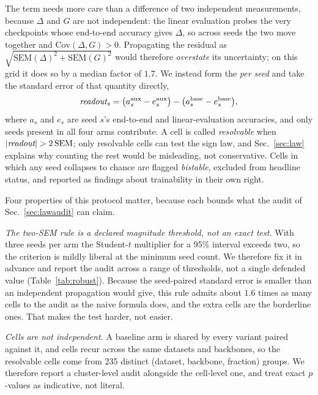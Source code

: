  The \readout{} term needs more care than a difference of two independent
measurements, because $\Delta$ and $G$ are not independent: the linear
evaluation probes the very checkpoints whose end-to-end accuracy gives
$\Delta$, so across seeds the two move together and $\mathrm{Cov}(\Delta, G) >
0$. Propagating the residual as $\sqrt{\mathrm{SEM}(\Delta)^2 +
\mathrm{SEM}(G)^2}$ would therefore \emph{overstate} its uncertainty; on this
grid it does so by a median factor of $1.7$. We instead form the \readout{}
\emph{per seed} and take the standard error of that quantity directly,
\begin{equation}
  \textit{readout}_s =
  \bigl(a^{\mathrm{aux}}_s - e^{\mathrm{aux}}_s\bigr) -
  \bigl(a^{\mathrm{base}}_s - e^{\mathrm{base}}_s\bigr),
  \label{eq:sem}
\end{equation}
where $a_s$ and $e_s$ are seed $s$'s end-to-end and linear-evaluation
accuracies, and only seeds present in all four arms contribute. A cell is
called \emph{resolvable} when $|\textit{readout}| > 2\,\mathrm{SEM}$; only
resolvable cells can test the sign law, and Sec.~\ref{sec:law} explains why
counting the rest would be misleading, not conservative. Cells in which any
seed collapses to chance are flagged \emph{bistable}, excluded from headline
status, and reported as findings about trainability in their own right.

Four properties of this protocol matter, because each bounds what the audit of
Sec.~\ref{sec:lawaudit} can claim.

\emph{The two-SEM rule is a declared magnitude threshold, not an exact test.}
With three seeds per arm the Student-$t$ multiplier for a 95\% interval exceeds
two, so the criterion is mildly liberal at the minimum seed count. We therefore
fix it in advance and report the audit across a range of thresholds, not a
single defended value (Table~\ref{tab:robust}). Because the seed-paired standard
error is smaller than an independent propagation would give, this rule admits
about $1.6$ times as many cells to the audit as the naive formula does, and the
extra cells are the borderline ones. That makes the test harder, not easier.

\emph{Cells are not independent.} A baseline arm is shared by every variant
paired against it, and cells recur across the same datasets and backbones, so
the \auditResolvable{} resolvable cells come from 235 distinct (dataset,
backbone, fraction) groups. We therefore report a cluster-level audit alongside
the cell-level one, and treat exact $p$-values as indicative, not literal.

